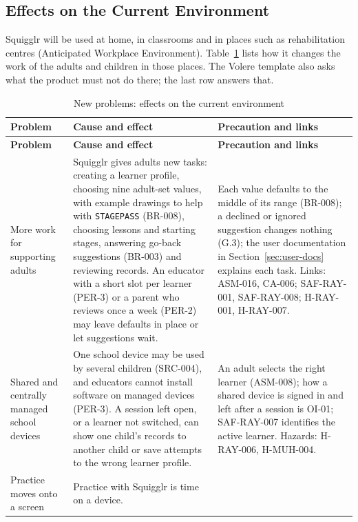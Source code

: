\documentclass[12pt]{article}
\renewcommand{\_}{\textunderscore\allowbreak}%
\begin{document}
\subsection{Effects on the Current Environment}
Squigglr will be used at home, in classrooms and in places such as
rehabilitation centres (Anticipated Workplace Environment).
Table~\ref{tab:new-problems-environment} lists how it changes the work of the
adults and children in those places. The Volere template also asks what the
product must not do there; the last row answers that.

{\small
\begin{longtable}{@{}>{\raggedright\arraybackslash}p{}%
>{\raggedright\arraybackslash}p{}%
>{\raggedright\arraybackslash}p{}@{}}
\caption{New problems: effects on the current environment}
\label{tab:new-problems-environment}\\
\toprule
\textbf{Problem} & \textbf{Cause and effect} & \textbf{Precaution and links} \\
\midrule
\endfirsthead
\toprule
\textbf{Problem} & \textbf{Cause and effect} & \textbf{Precaution and links} \\
\midrule
\endhead
\bottomrule
\endlastfoot
More work for supporting adults & Squigglr gives adults new tasks: creating a
learner profile, choosing nine adult-set values, with example drawings to help
with \texttt{STAGE\_PASS} (BR-008), choosing lessons and starting stages,
answering go-back suggestions (BR-003) and reviewing records. An educator with a
short slot per learner (PER-3) or a parent who reviews once a week (PER-2) may
leave defaults in place or let suggestions wait. & Each value defaults to the
middle of its range (BR-008); a declined or ignored suggestion changes nothing
(G.3); the user documentation in Section~\ref{sec:user-docs} explains each task.
Links: ASM-016, CA-006; SAF-RAY-001, SAF-RAY-008; H-RAY-001, H-RAY-007. \\
\addlinespace
Shared and centrally managed school devices & One school device may be used by
several children (SRC-004), and educators cannot install software on managed
devices (PER-3). A session left open, or a learner not switched, can show one
child's records to another child or save attempts to the wrong learner profile.
& An adult selects the right learner (ASM-008); how a shared device is signed in
and left after a session is OI-01; SAF-RAY-007 identifies the active learner.
Hazards: H-RAY-006, H-MUH-004. \\
\addlinespace
Practice moves onto a screen & Practice with Squigglr is time on a device.

\end{longtable}}
\end{document}
